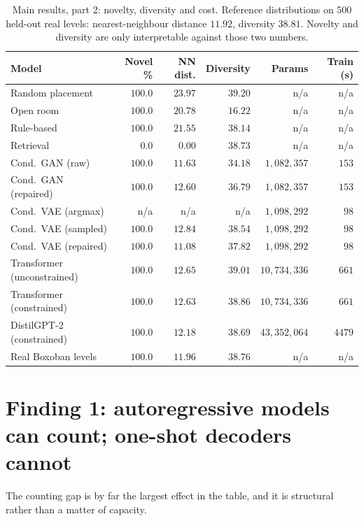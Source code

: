 \documentclass[11pt,a4paper]{report}
\begin{document}
\begin{table}[!htb]
\centering\footnotesize
\caption[Main results: novelty, diversity and cost]{Main results, part 2:
novelty, diversity and cost. Reference distributions on $500$ held-out real
levels: nearest-neighbour distance $11.92$, diversity $38.81$. Novelty and
diversity are only interpretable against those two numbers.}
\label{tab:main2}
\begin{tabular}{@{}l r r r r r@{}}
\toprule
\textbf{Model} & \textbf{Novel \%} & \textbf{NN dist.} &
\textbf{Diversity} & \textbf{Params} & \textbf{Train (s)} \\
\midrule
Random placement & $100.0$ & $23.97$ & $39.20$ & n/a & n/a \\
Open room & $100.0$ & $20.78$ & $16.22$ & n/a & n/a \\
Rule-based & $100.0$ & $21.55$ & $38.14$ & n/a & n/a \\
Retrieval & $\mathbf{0.0}$ & $\mathbf{0.00}$ & $38.73$ & n/a & n/a \\
\midrule
Cond.\ GAN (raw) & $100.0$ & $11.63$ & $34.18$ & $1{,}082{,}357$ & $153$ \\
Cond.\ GAN (repaired) & $100.0$ & $12.60$ & $36.79$ & $1{,}082{,}357$ & $153$ \\
Cond.\ VAE (argmax) & n/a & n/a & n/a & $1{,}098{,}292$ & $98$ \\
Cond.\ VAE (sampled) & $100.0$ & $12.84$ & $38.54$ & $1{,}098{,}292$ & $98$ \\
Cond.\ VAE (repaired) & $100.0$ & $11.08$ & $37.82$ & $1{,}098{,}292$ & $98$ \\
\midrule
Transformer (unconstrained) & $100.0$ & $12.65$ & $39.01$ & $10{,}734{,}336$ &
  $661$ \\
Transformer (constrained) & $100.0$ & $12.63$ & $38.86$ & $10{,}734{,}336$ &
  $661$ \\
DistilGPT-2 (constrained) & $100.0$ & $12.18$ & $38.69$ & $43{,}352{,}064$ &
  $4479$ \\
\midrule
Real Boxoban levels & $100.0$ & $11.96$ & $38.76$ & n/a & n/a \\
\bottomrule
\end{tabular}
\end{table}

\section{Finding 1: autoregressive models can count; one-shot decoders cannot}

The counting gap is by far the largest effect in the table, and it is structural
rather than a matter of capacity.
\end{document}
